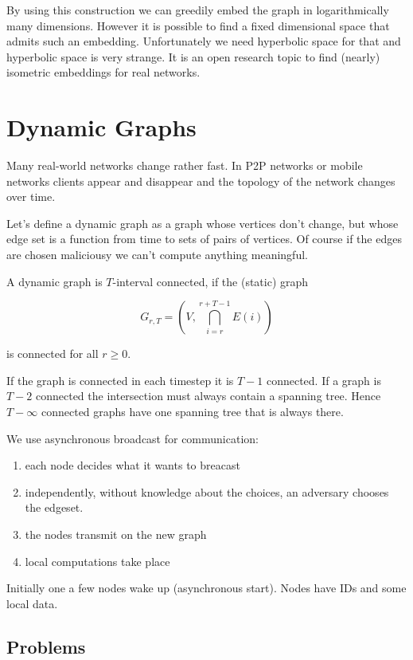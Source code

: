 By using this construction we can greedily embed the graph in logarithmically many dimensions. However it is possible to find a fixed dimensional space that admits such an embedding. Unfortunately we need hyperbolic space for that and hyperbolic space is very strange. It is an open research topic to find (nearly) isometric embeddings for real networks.

\section{Dynamic Graphs}

Many real-world networks change rather fast. In P2P networks or mobile networks clients appear and disappear and the topology of the network changes over time.

Let's define a dynamic graph as a graph whose vertices don't change, but whose edge set is a function from time to sets of pairs of vertices. Of course if the edges are chosen maliciousy we can't compute anything meaningful.

\begin{Def} A dynamic graph is $T$-interval connected, if the (static) graph

\[G_{r,T} = (V, \bigcap_{i=r}^{r+T-1} E(i))\]

is connected for all $r\geq 0$.
\end{Def}

If the graph is connected in each timestep it is $T-1$ connected. If a graph is $T-2$ connected the intersection must always contain a spanning tree. Hence $T-\infty$ connected graphs have one spanning tree that is always there.

We use asynchronous broadcast for communication:
\begin{enumerate}
\item each node decides what it wants to breacast
\item independently, without knowledge about the choices, an adversary chooses the edgeset.
\item the nodes transmit on the new graph
\item local computations take place
\end{enumerate}

Initially one a few nodes wake up (asynchronous start). Nodes have IDs and some local data.

\subsection{Problems}

